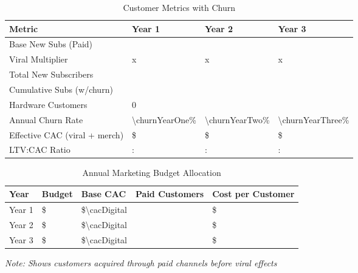 
\begin{table}[H]
\centering
\caption{Customer Metrics with Churn}
\begin{tabularx}{\linewidth}{l Y Y Y}
\toprule
Metric & Year 1 & Year 2 & Year 3 \\\midrule
Base New Subs (Paid) & \numint{\baseNewSubsYearOne} & \numint{\baseNewSubsYearTwo} & \numint{\baseNewSubsYearThree} \\
Viral Multiplier & \numfpeval{\viralMultiplierYearOne}x & \numfpeval{\viralMultiplierYearTwo}x & \numfpeval{\viralMultiplierYearThree}x \\
Total New Subscribers & \numint{\newSubsYearOne} & \numint{\newSubsYearTwo} & \numint{\newSubsYearThree} \\
Cumulative Subs (w/churn) & \numint{\totalSubsYearOne} & \numint{\totalSubsYearTwo} & \numint{\totalSubsYearThree} \\
Hardware Customers & \num{0} & \numint{\hwCustomersYearTwo} & \numint{\hwCustomersYearThree} \\
Annual Churn Rate\cite{recurly2024} & \num{\churnYearOne}\% & \num{\churnYearTwo}\% & \num{\churnYearThree}\% \\
Effective CAC (viral + merch) & \$\numint{\effectiveCACYearOne - \merchOffsetSubsCalc} & \$\numint{\effectiveCACYearTwo - \merchOffsetSubsCalc} & \$\numint{\effectiveCACYearThree - \merchOffsetSubsCalc} \\
LTV:CAC Ratio & \numint{\subLTV/(\effectiveCACYearOne - \merchOffsetSubsCalc)}: & \numint{\subLTV/(\effectiveCACYearTwo - \merchOffsetSubsCalc)}: & \numint{\subLTV/(\effectiveCACYearThree - \merchOffsetSubsCalc)}: \\
\bottomrule
\end{tabularx}
\end{table}

\begin{table}[H]
\centering
\caption{Annual Marketing Budget Allocation}
\begin{tabularx}{\linewidth}{l Y Y Y Y}
\toprule
Year & Budget & Base CAC & Paid Customers & Cost per Customer \\\midrule
Year 1 & \$\numint{\marketingBudgetYearOne} & \$\num{\cacDigital} & \numint{\baseNewSubsYearOne} & \$\numint{\cacDigital} \\
Year 2 & \$\numint{\marketingBudgetYearTwo} & \$\num{\cacDigital} & \numint{\baseNewSubsYearTwo} & \$\numint{\cacDigital} \\
Year 3 & \$\numint{\marketingBudgetYearThree} & \$\num{\cacDigital} & \numint{\baseNewSubsYearThree} & \$\numint{\cacDigital} \\
\bottomrule
\end{tabularx}
\end{table}
\textit{Note: Shows customers acquired through paid channels before viral effects}

